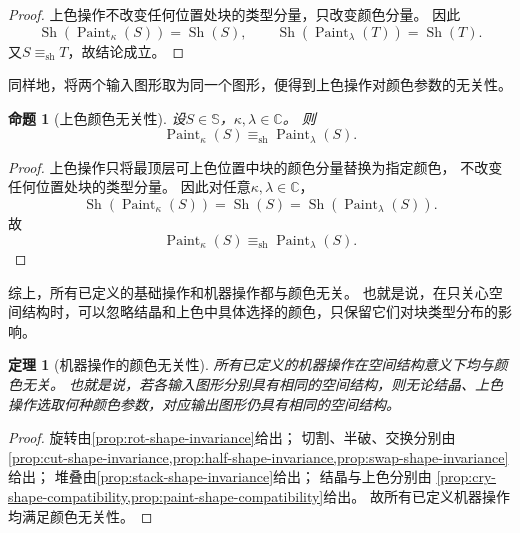 \documentclass[UTF8,fontset=none]{ctexart}
\theoremstyle{cnthm}
\newtheorem{proposition}{命题}[section]
\newtheorem{theorem}{定理}[section]
\begin{document}
			\begin{proof}
				上色操作不改变任何位置处块的类型分量，只改变颜色分量。
				因此
				$$
				\operatorname{Sh}(\operatorname{Paint}_{\kappa}(S))
				=
				\operatorname{Sh}(S),
				\qquad
				\operatorname{Sh}(\operatorname{Paint}_{\lambda}(T))
				=
				\operatorname{Sh}(T).
				$$
				又$S\equiv_{\mathrm{sh}}T$，故结论成立。
			\end{proof}
			
			同样地，将两个输入图形取为同一个图形，便得到上色操作对颜色参数的无关性。
			
			\begin{proposition}[上色颜色无关性]\label{prop:paint-color-independence}
				设$S\in\mathbb{S}$，$\kappa,\lambda\in\mathbb{C}$。
				则
				$$
				\operatorname{Paint}_{\kappa}(S)
				\equiv_{\mathrm{sh}}
				\operatorname{Paint}_{\lambda}(S).
				$$
			\end{proposition}
			
			\begin{proof}
				上色操作只将最顶层可上色位置中块的颜色分量替换为指定颜色，
				不改变任何位置处块的类型分量。
				因此对任意$\kappa,\lambda\in\mathbb{C}$，
				$$
				\operatorname{Sh}(\operatorname{Paint}_{\kappa}(S))
				=
				\operatorname{Sh}(S)
				=
				\operatorname{Sh}(\operatorname{Paint}_{\lambda}(S)).
				$$
				故
				$$
				\operatorname{Paint}_{\kappa}(S)
				\equiv_{\mathrm{sh}}
				\operatorname{Paint}_{\lambda}(S).
				$$
			\end{proof}
			
			综上，所有已定义的基础操作和机器操作都与颜色无关。
			也就是说，在只关心空间结构时，可以忽略结晶和上色中具体选择的颜色，只保留它们对块类型分布的影响。
			
			\begin{theorem}[机器操作的颜色无关性]\label{thm:machine-shape-invariance}
				所有已定义的机器操作在空间结构意义下均与颜色无关。
				也就是说，若各输入图形分别具有相同的空间结构，则无论结晶、上色操作选取何种颜色参数，对应输出图形仍具有相同的空间结构。
			\end{theorem}
			
			\begin{proof}
				旋转由\cref{prop:rot-shape-invariance}给出；
				切割、半破、交换分别由
				\cref{prop:cut-shape-invariance,prop:half-shape-invariance,prop:swap-shape-invariance}给出；
				堆叠由\cref{prop:stack-shape-invariance}给出；
				结晶与上色分别由
				\cref{prop:cry-shape-compatibility,prop:paint-shape-compatibility}给出。
				故所有已定义机器操作均满足颜色无关性。
			\end{proof}
			
\end{document}
